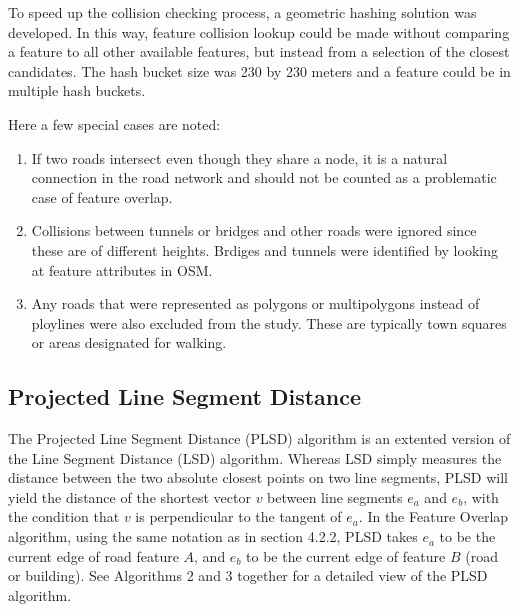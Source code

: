 \documentclass{kththesis}
\begin{document}
To speed up the collision checking process, a geometric hashing solution was developed.
In this way, feature collision lookup could be made without comparing a feature to all other available features, but instead from a selection of the closest candidates.
The hash bucket size was 230 by 230 meters and a feature could be in multiple hash buckets.

Here a few special cases are noted:
\begin{enumerate}
    \item If two roads intersect even though they share a node, it is a natural connection in the road network and should not be counted as a problematic case of feature overlap.
    \item Collisions between tunnels or bridges and other roads were ignored since these are of different heights. Brdiges and tunnels were identified by looking at feature attributes in OSM.
    \item Any roads that were represented as polygons or multipolygons instead of ploylines were also excluded from the study. These are typically town squares or areas designated for walking.
\end{enumerate}

\subsection{Projected Line Segment Distance}

The Projected Line Segment Distance (PLSD) algorithm is an extented version of the Line Segment Distance (LSD) algorithm.
Whereas LSD simply measures the distance between the two absolute closest points on two line segments, PLSD will yield the distance of the shortest vector $v$ between line segments $e_a$ and $e_b$, with the condition that $v$ is perpendicular to the tangent of $e_a$.
In the Feature Overlap algorithm, using the same notation as in section 4.2.2, PLSD takes $e_a$ to be the current edge of road feature $A$, and $e_b$ to be the current edge of feature $B$ (road or building).
See Algorithms 2 and 3 together for a detailed view of the PLSD algorithm.
\end{document}
